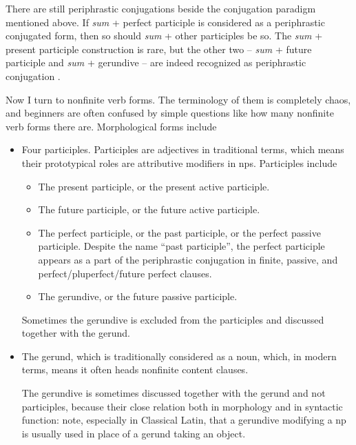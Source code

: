 \documentclass{article}
\newcommand*{\citesec}[1]{\S~{#1}}
\newcommand*{\corpus}[1]{\emph{#1}}
\begin{document}
There are still periphrastic conjugations beside the conjugation paradigm mentioned above.
If \corpus{sum} + perfect participle is considered as a periphrastic conjugated form,
then so should \corpus{sum} + other participles be so.
The \corpus{sum} + present participle construction is rare,
but the other two -- 
\corpus{sum} + future participle and \corpus{sum} + gerundive
-- are indeed recognized as periphrastic conjugation \citep[\citesec{193-196}]{allen1903allen}.

Now I turn to nonfinite verb forms.
The terminology of them is completely chaos, 
and beginners are often confused by simple questions like how many nonfinite verb forms there are.
Morphological forms include 
\begin{itemize}
    \item Four participles. Participles are adjectives in traditional terms,
    which means their prototypical roles are attributive modifiers in \ac{np}s.
    Participles include 
    \begin{itemize}
        \item The present participle, or the present active participle.
        \item The future participle, or the future active participle.
        \item The perfect participle, or the past participle, or the perfect passive participle.
        Despite the name ``past participle'', the perfect participle appears 
        as a part of the periphrastic conjugation
        in finite, passive, and perfect/pluperfect/future perfect clauses.
        \item The gerundive, or the future passive participle.
    \end{itemize}
    Sometimes the gerundive is excluded from the participles and discussed together with the gerund.
    \item The gerund, which is traditionally considered as a noun,
    which, in modern terms, means it often heads nonfinite content clauses.

    The gerundive is sometimes discussed together with the gerund and not participles,
    because their close relation both in morphology and in syntactic function:
    note, especially in Classical Latin, that 
    a gerundive modifying a \ac{np} is usually used in place of 
    a gerund taking an object.


\end{itemize}
\end{document}
